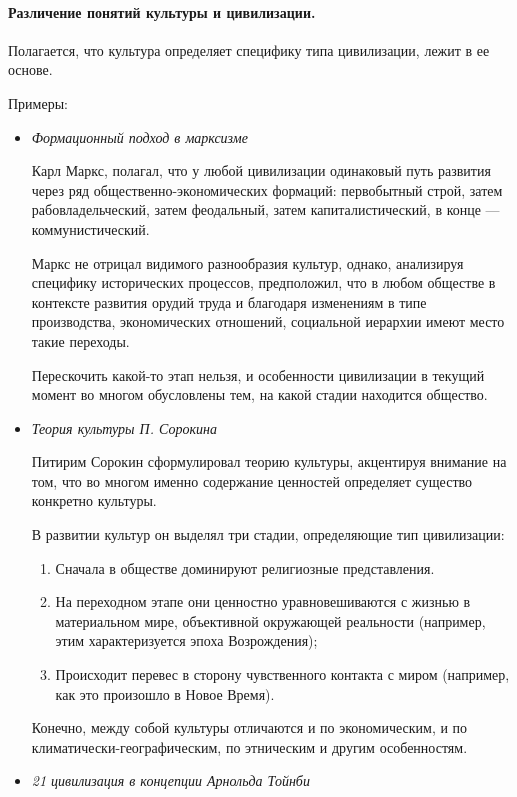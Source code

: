 \paragraph{Различение понятий культуры и цивилизации.}
Полагается, что культура определяет специфику типа цивилизации, лежит в
ее основе. 

Примеры:  
\begin{itemize}

\item \textit{Формационный подход в марксизме}

Карл Маркс, полагал, что у любой цивилизации одинаковый путь развития через
ряд общественно-экономических формаций:
первобытный строй, затем рабовладельческий, затем феодальный, затем капиталистический, 
в конце --- коммунистический. 

Маркс не отрицал видимого разнообразия культур,
однако, анализируя специфику исторических процессов, предположил, что в любом
обществе в контексте развития орудий труда и благодаря изменениям в типе
производства, экономических отношений, социальной иерархии имеют место такие
переходы. 

Перескочить какой-то этап нельзя, и особенности
цивилизации в текущий момент во многом обусловлены тем, на какой стадии
находится общество. 

\item \textit{Теория культуры П. Сорокина}

Питирим Сорокин сформулировал теорию культуры,
акцентируя внимание на том, что во
многом именно содержание ценностей определяет существо конкретно культуры. 

В развитии культур он выделял три стадии, определяющие тип цивилизации:
\begin{enumerate}
    \item Сначала в обществе доминируют религиозные представления.
    \item На переходном этапе они ценностно
    уравновешиваются с жизнью в материальном мире, объективной окружающей
    реальности (например, этим характеризуется эпоха Возрождения);
    \item Происходит перевес в сторону чувственного контакта с миром (например, как это произошло в Новое Время).
\end{enumerate}
Конечно, между собой культуры
отличаются и по экономическим, и по климатически-географическим, по этническим и другим особенностям. 

\item \textit{21 цивилизация в концепции Арнольда Тойнби}


\end{itemize}
